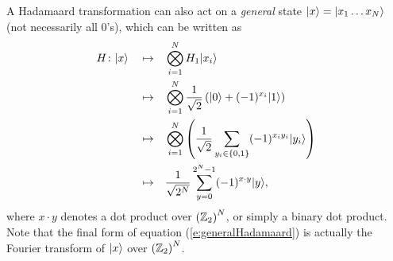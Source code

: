 A Hadamaard transformation can also act on a {\sl general} state 
${|{x}\rangle}={|{x_1\ldots x_N}\rangle}$
(not necessarily all 0's), which can be written as
\begin{equation}
\begin{split}
H\colon{|{x}\rangle}\quad\mapsto\quad&
\bigotimes_{i=1}^N 
H_1{|{x_i}\rangle}\\
\quad\mapsto\quad&
\bigotimes_{i=1}^N 
\frac{1}{\sqrt{2}} \left( {|{0}\rangle} + (-1)^{x_i}{|{1}\rangle} \right)\\
\quad\mapsto\quad&
\bigotimes_{i=1}^N 
\left(\frac{1}{\sqrt{2}} \sum_{y_i\in\lbrace 0,1\rbrace} 
(-1)^{x_iy_i}{|{y_i}\rangle}\right)\\
\quad\mapsto\quad&
\frac{1}{\sqrt{2^N}} \sum_{y=0}^{2^N-1} (-1)^{x\cdot y}{|{y}\rangle},
\end{split}
\label{e:generalHadamaard}
\end{equation}
where $x\cdot y$ denotes a dot product over $\left({\mathbb{Z}}_2\right)^N$, or
simply a binary dot product.  Note that the final form of equation
(\ref{e:generalHadamaard}) is actually the Fourier transform of ${|{x}\rangle}$
over $\left({\mathbb{Z}}_2\right)^N$.



%

%

%

